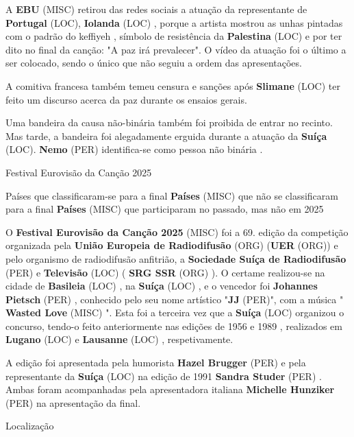 \documentclass[12pt,a4paper]{article}
\begin{document}
A \textbf{EBU} (MISC) retirou das redes sociais a atuação da representante de \textbf{Portugal} (LOC), \textbf{Iolanda} (LOC) , porque a artista mostrou as unhas pintadas com o padrão do keffiyeh , símbolo de resistência da \textbf{Palestina} (LOC) e por ter dito no final da canção: "A paz irá prevalecer". O vídeo da atuação foi o último a ser colocado, sendo o único que não seguiu a ordem das apresentações.

A comitiva francesa também temeu censura e sanções após \textbf{Slimane} (LOC) ter feito um discurso acerca da paz durante os ensaios gerais.

Uma bandeira da causa não-binária também foi proibida de entrar no recinto. Mas tarde, a bandeira foi alegadamente erguida durante a atuação da \textbf{Suíça} (LOC). \textbf{Nemo} (PER) identifica-se como pessoa não binária .



Festival Eurovisão da Canção 2025



Países que classificaram-se para a final \textbf{Países} (MISC) que não se classificaram para a final \textbf{Países} (MISC) que participaram no passado, mas não em 2025

O \textbf{Festival Eurovisão da Canção 2025} (MISC) foi a 69. edição da competição organizada pela \textbf{União Europeia de Radiodifusão} (ORG) (\textbf{UER} (ORG)) e pelo organismo de radiodifusão anfitrião, a \textbf{Sociedade Suíça de Radiodifusão} (PER) e \textbf{Televisão} (LOC) ( \textbf{SRG SSR} (ORG) ). O certame realizou-se na cidade de \textbf{Basileia} (LOC) , na \textbf{Suíça} (LOC) , e o vencedor foi \textbf{Johannes Pietsch} (PER) , conhecido pelo seu nome artístico "\textbf{JJ} (PER)", com a música " \textbf{Wasted Love} (MISC) ". Esta foi a terceira vez que a \textbf{Suíça} (LOC) organizou o concurso, tendo-o feito anteriormente nas edições de 1956 e 1989 , realizados em \textbf{Lugano} (LOC) e \textbf{Lausanne} (LOC) , respetivamente.

A edição foi apresentada pela humorista \textbf{Hazel Brugger} (PER) e pela representante da \textbf{Suíça} (LOC) na edição de 1991 \textbf{Sandra Studer} (PER) . Ambas foram acompanhadas pela apresentadora italiana \textbf{Michelle Hunziker} (PER) na apresentação da final.



Localização
\end{document}
